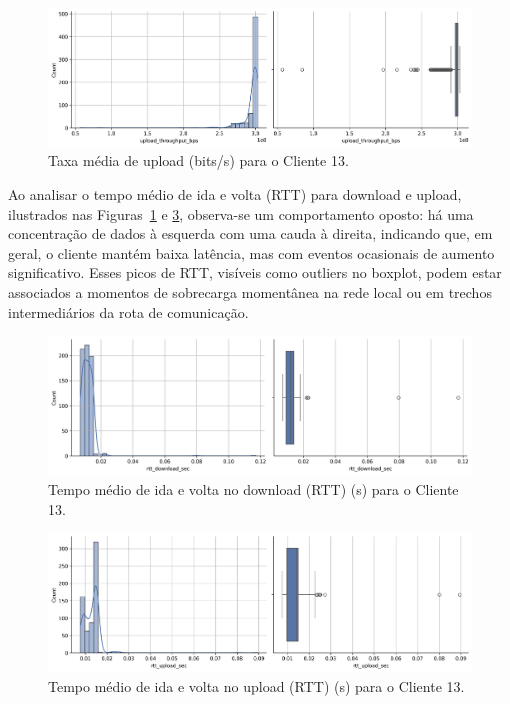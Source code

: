 \documentclass{article}
\begin{document}
\begin{figure}[htp]
	\includegraphics[width=\textwidth]{../figures/eda/chart_upload_throughput_bps_client13.png}
	\caption{Taxa média de upload (bits/s) para o Cliente 13.}
	\label{fig:chart_rtt_download_sec_client13}
\end{figure}

Ao analisar o tempo médio de ida e volta (RTT) para download e upload, ilustrados nas Figuras~\ref{fig:chart_rtt_download_sec_client13} e \ref{fig:chart_rtt_upload_sec_client13}, observa-se um comportamento oposto: há uma concentração de dados à esquerda com uma cauda à direita, indicando que, em geral, o cliente mantém baixa latência, mas com eventos ocasionais de aumento significativo.  
Esses picos de RTT, visíveis como outliers no boxplot, podem estar associados a momentos de sobrecarga momentânea na rede local ou em trechos intermediários da rota de comunicação.

\begin{figure}[htp]
	\includegraphics[width=\textwidth]{../figures/eda/chart_rtt_download_sec_client13.png}
	\caption{Tempo médio de ida e volta no download (RTT) (s) para o Cliente 13.}
	\label{fig:chart_upload_throughput_bps_client13}
\end{figure}

\begin{figure}[htp]
	\includegraphics[width=\textwidth]{../figures/eda/chart_rtt_upload_sec_client13.png}
	\caption{Tempo médio de ida e volta no upload (RTT) (s) para o Cliente 13.}
	\label{fig:chart_rtt_upload_sec_client13}
\end{figure}
\end{document}
